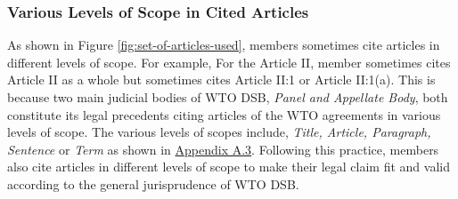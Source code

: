 
 
\subsubsection{Various Levels of Scope in Cited Articles}

As shown in Figure \ref{fig:set-of-articles-used},
members sometimes
cite articles in different levels of scope. For example,
For the Article II, member sometimes cites
Article II as a whole but sometimes cites
Article II:1 or Article II:1(a).
This is because two main judicial bodies of WTO DSB, \textit{Panel and Appellate Body},
both constitute its legal precedents citing articles of the WTO agreements in
various levels of scope.
The various levels of scopes include, \textit{Title, Article, Paragraph, Sentence} or \textit{Term} as shown in  \hyperref[xltabular:level-of-scopes]{Appendix A.3}.
Following this practice, members also cite articles in different levels of scope to
make their legal claim fit and valid according to the general jurisprudence of WTO DSB.\\ %

 
 
 

